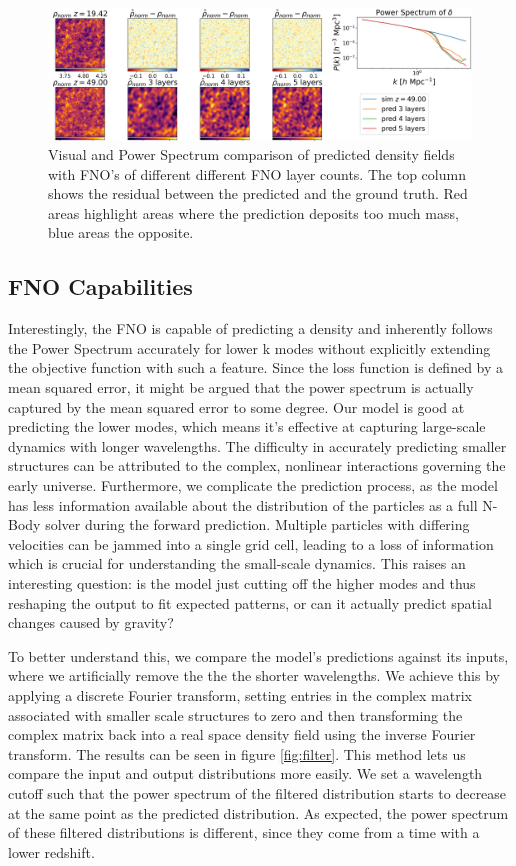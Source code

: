 \documentclass{article}
\begin{document}
\begin{figure}[h]
    \centering
    \includegraphics[width=0.95\linewidth]{img/compare_layers_2.png}
    \caption{Visual and Power Spectrum comparison of predicted density fields with FNO's of different different FNO layer counts. The top column shows the residual between the predicted and the ground truth. Red areas highlight areas where the prediction deposits too much mass, blue areas the opposite. }
    \label{fig:layer-A}
\end{figure}



\subsection{FNO Capabilities}

Interestingly, the FNO is capable of predicting a density and inherently follows the Power Spectrum accurately for lower k modes without explicitly extending the objective function with such a feature. Since the loss function is defined by a mean squared error, it might be argued that the power spectrum is actually captured by the mean squared error to some degree.
Our model is good at predicting the lower modes, which means it's effective at capturing large-scale dynamics with longer wavelengths. The difficulty in accurately predicting smaller structures can be attributed to the complex, nonlinear interactions governing the early universe. Furthermore, we complicate the prediction process, as the model has less information available about the distribution of the particles as a full N-Body solver during the forward prediction. Multiple particles with differing velocities can be jammed into a single grid cell, leading to a loss of information which is crucial for understanding the small-scale dynamics. This raises an interesting question: is the model just cutting off the higher modes and thus reshaping the output to fit expected patterns, or can it actually predict spatial changes caused by gravity? 

To better understand this, we compare the model's predictions against its inputs, where we artificially remove the the the shorter wavelengths. We achieve this by applying a discrete Fourier transform, setting entries in the complex matrix  associated with smaller scale structures to zero and then transforming the complex matrix back into a real space density field using the inverse Fourier transform. The results can be seen in figure \ref{fig:filter}. This method lets us compare the input and output distributions more easily. We set a wavelength cutoff such that the power spectrum of the filtered distribution starts to decrease at the same point as the predicted distribution. As expected, the power spectrum of these filtered distributions is different, since they come from a time with a lower redshift.
\end{document}
